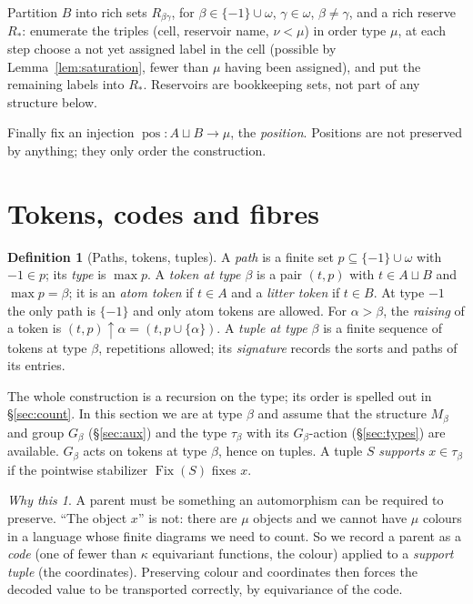 \documentclass[11pt]{article}
\theoremstyle{definition}
\newtheorem{definition}[theorem]{Definition}
\theoremstyle{remark}
\newtheorem*{idea}{Why this}
\newcommand{\Fix}{\operatorname{Fix}}
\newcommand{\pos}{\operatorname{pos}}
\newcommand{\up}{\!\uparrow\!}
\begin{document}
Partition \(B\) into rich sets \(R_{\beta\gamma}\), for \(\beta\in\{-1\}
\cup\omega\), \(\gamma\in\omega\), \(\beta\neq\gamma\), and a rich reserve
\(R_*\): enumerate the triples (cell, reservoir name, \(\nu<\mu\)) in order
type \(\mu\), at each step choose a not yet assigned label in the cell
(possible by Lemma~\ref{lem:saturation}, fewer than \(\mu\) having been
assigned), and put the remaining labels into \(R_*\). Reservoirs are
bookkeeping sets, not part of any structure below.

Finally fix an injection \(\pos:A\sqcup B\to\mu\), the \emph{position}.
Positions are not preserved by anything; they only order the construction.

\section{Tokens, codes and fibres}\label{sec:codes}

\begin{definition}[Paths, tokens, tuples]
A \emph{path} is a finite set \(p\subseteq\{-1\}\cup\omega\) with
\(-1\in p\); its \emph{type} is \(\max p\). A \emph{token at type
\(\beta\)} is a pair \((t,p)\) with \(t\in A\sqcup B\) and \(\max p=
\beta\); it is an \emph{atom token} if \(t\in A\) and a \emph{litter
token} if \(t\in B\). At type \(-1\) the only path is \(\{-1\}\) and only
atom tokens are allowed. For \(\alpha>\beta\), the \emph{raising} of a
token is \((t,p)\up\alpha=(t,p\cup\{\alpha\})\). A \emph{tuple at type
\(\beta\)} is a finite sequence of tokens at type \(\beta\), repetitions
allowed; its \emph{signature} records the sorts and paths of its entries.
\end{definition}

The whole construction is a recursion on the type; its order is spelled
out in \S\ref{sec:count}. In this section we are at type \(\beta\) and
assume that the structure \(M_\beta\) and group \(G_\beta\)
(\S\ref{sec:aux}) and the type \(\tau_\beta\) with its \(G_\beta\)-action
(\S\ref{sec:types}) are available. \(G_\beta\) acts on tokens at type
\(\beta\), hence on tuples. A tuple \(S\) \emph{supports} \(x\in
\tau_\beta\) if the pointwise stabilizer \(\Fix(S)\) fixes \(x\).

\begin{idea}
A parent must be something an automorphism can be required to preserve.
``The object \(x\)'' is not: there are \(\mu\) objects and we cannot have
\(\mu\) colours in a language whose finite diagrams we need to count. So we
record a parent as a \emph{code} (one of fewer than \(\kappa\)
equivariant functions, the colour) applied to a \emph{support tuple} (the
coordinates). Preserving colour and coordinates then forces the decoded
value to be transported correctly, by equivariance of the code.
\end{idea}
\end{document}
